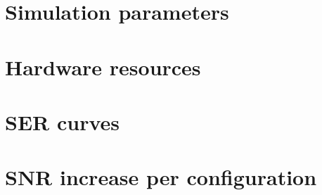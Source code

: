 \documentclass[ecp,tc,english]{iiufrgs}
\begin{document}









% 




\appendix
\chapter{Simulation parameters}\label{ap:parametros}

\chapter{Hardware resources}\label{ap:recursos}

\makeatletter
\setlength{\@fptop}{0pt}
\makeatother
\chapter{SER curves}\label{ap:curvas-ser}
\makeatletter
\setlength{\@fptop}{0pt plus 1fil}
\makeatother

\chapter{SNR increase per configuration}\label{ap:perfis-configuracao}

\end{document}
